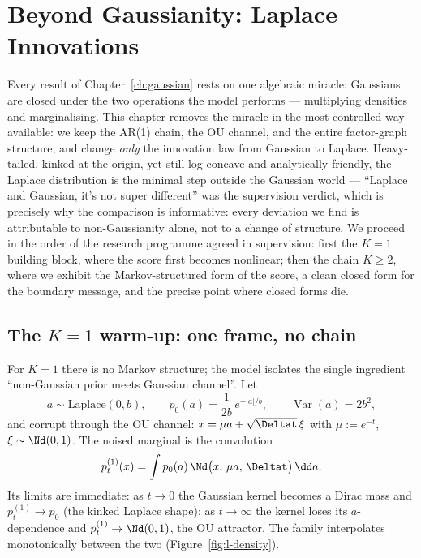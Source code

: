 \chapter{Beyond Gaussianity: Laplace Innovations}\label{ch:laplace}

Every result of Chapter~\ref{ch:gaussian} rests on one algebraic miracle:
Gaussians are closed under the two operations the model performs ---
multiplying densities and marginalising. This chapter removes the miracle in
the most controlled way available: we keep the AR(1) chain, the OU channel,
and the entire factor-graph structure, and change \emph{only} the innovation
law from Gaussian to Laplace. Heavy-tailed, kinked at the origin, yet still
log-concave and analytically friendly, the Laplace distribution is the
minimal step outside the Gaussian world --- ``Laplace and Gaussian, it's not
super different'' was the supervision verdict, which is precisely why the
comparison is informative: every deviation we find is attributable to
non-Gaussianity alone, not to a change of structure. We proceed in the order
of the research programme agreed in supervision: first the $K = 1$ building
block, where the score first becomes nonlinear; then the chain $K \geq 2$,
where we exhibit the Markov-structured form of the score, a clean closed
form for the boundary message, and the precise point where closed forms die.

\section{The $K = 1$ warm-up: one frame, no chain}\label{sec:l-K1}

For $K = 1$ there is no Markov structure; the model isolates the single
ingredient ``non-Gaussian prior meets Gaussian channel''. Let
\begin{equation}
  a \sim \mathrm{Laplace}(0, b), \qquad
  p_0(a) = \frac{1}{2b}\, e^{-|a|/b}, \qquad
  \operatorname{Var}(a) = 2b^2 ,
  \label{eq:l-prior}
\end{equation}
and corrupt through the OU channel: $x = \mu a + \sqrt{\Deltat}\,\xi$ with
$\mu := e^{-t}$, $\xi \sim \Nd(0,1)$. The noised marginal is the
convolution
\begin{equation}
  p_t^{(1)}(x) = \int p_0(a)\, \Nd\big(x;\, \mu a,\, \Deltat\big)\, \dd a .
  \label{eq:l-pt1}
\end{equation}
Its limits are immediate: as $t \to 0$ the Gaussian kernel becomes a Dirac
mass and $p_t^{(1)} \to p_0$ (the kinked Laplace shape); as $t \to \infty$
the kernel loses its $a$-dependence and $p_t^{(1)} \to \Nd(0, 1)$, the OU
attractor. The family interpolates monotonically between the two
(Figure~\ref{fig:l-density}).

